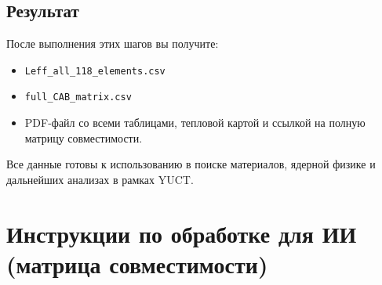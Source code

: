 \documentclass[11pt,a4paper]{article}
\begin{document}
	\subsection*{Результат}
	После выполнения этих шагов вы получите:
	\begin{itemize}
		\item \texttt{Leff\_all\_118\_elements.csv}
		\item \texttt{full\_CAB\_matrix.csv}
		\item PDF-файл со всеми таблицами, тепловой картой и ссылкой на полную матрицу совместимости.
	\end{itemize}
	Все данные готовы к использованию в поиске материалов, ядерной физике и дальнейших анализах в рамках YUCT.
	
	\section*{Инструкции по обработке для ИИ (матрица совместимости)}
	\label{sec:ai_instructions}
	
\end{document}
